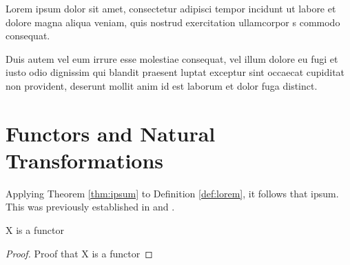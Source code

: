 \documentclass{article}
\begin{document}
Lorem ipsum dolor sit amet, consectetur adipisci tempor incidunt ut labore et dolore magna aliqua veniam, quis nostrud exercitation ullamcorpor s commodo consequat. 

\begin{theorem}\label{thm:ipsum}
	Duis autem vel eum irrure esse molestiae consequat, vel illum dolore eu fugi et iusto odio dignissim qui blandit praesent luptat exceptur sint occaecat cupiditat non provident, deserunt mollit anim id est laborum et dolor fuga distinct.
\end{theorem}



\section{Functors and Natural Transformations}

Applying Theorem \ref{thm:ipsum} to Definition \ref{def:lorem}, it follows that ipsum. This was previously established in \cite{Gauss86} and \cite{Euclid02,Euclid03}.

\begin{theorem}
X is a functor
\end{theorem}
\begin{proof}
Proof that X is a functor
\end{proof}





\end{document}
